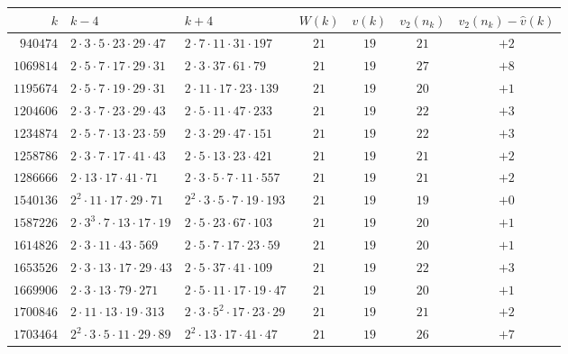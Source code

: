 \documentclass[12pt]{amsart}%
\newcommand{\1}{\mathds{1}}
\theoremstyle{definition}
\numberwithin{equation}{section}
\numberwithin{table}{section}
\numberwithin{figure}{section}
\begin{document}
\begin{table}[htbp]
\centering\small
\setlength{\tabcolsep}{4.5pt}
\begin{tabular}{r l l c c c c}
\toprule
$k$ & $k-4$ & $k+4$ & $W(k)$ & $\hat v(k)$ & $v_2(n_k)$ & $v_2(n_k)-\hat v(k)$\\
\midrule
$940474$  & $2\cdot3\cdot5\cdot23\cdot29\cdot47$     & $2\cdot7\cdot11\cdot31\cdot197$         & $21$ & $19$ & $21$ & $+2$\\
$1069814$ & $2\cdot5\cdot7\cdot17\cdot29\cdot31$     & $2\cdot3\cdot37\cdot61\cdot79$          & $21$ & $19$ & $27$ & $+8$\\
$1195674$ & $2\cdot5\cdot7\cdot19\cdot29\cdot31$     & $2\cdot11\cdot17\cdot23\cdot139$        & $21$ & $19$ & $20$ & $+1$\\
$1204606$ & $2\cdot3\cdot7\cdot23\cdot29\cdot43$     & $2\cdot5\cdot11\cdot47\cdot233$         & $21$ & $19$ & $22$ & $+3$\\
$1234874$ & $2\cdot5\cdot7\cdot13\cdot23\cdot59$     & $2\cdot3\cdot29\cdot47\cdot151$         & $21$ & $19$ & $22$ & $+3$\\
$1258786$ & $2\cdot3\cdot7\cdot17\cdot41\cdot43$     & $2\cdot5\cdot13\cdot23\cdot421$         & $21$ & $19$ & $21$ & $+2$\\
$1286666$ & $2\cdot13\cdot17\cdot41\cdot71$          & $2\cdot3\cdot5\cdot7\cdot11\cdot557$    & $21$ & $19$ & $21$ & $+2$\\
$1540136$ & $2^{2}\cdot11\cdot17\cdot29\cdot71$      & $2^{2}\cdot3\cdot5\cdot7\cdot19\cdot193$ & $21$ & $19$ & $19$ & $+0$\\
$1587226$ & $2\cdot3^{3}\cdot7\cdot13\cdot17\cdot19$ & $2\cdot5\cdot23\cdot67\cdot103$         & $21$ & $19$ & $20$ & $+1$\\
$1614826$ & $2\cdot3\cdot11\cdot43\cdot569$          & $2\cdot5\cdot7\cdot17\cdot23\cdot59$    & $21$ & $19$ & $20$ & $+1$\\
$1653526$ & $2\cdot3\cdot13\cdot17\cdot29\cdot43$    & $2\cdot5\cdot37\cdot41\cdot109$         & $21$ & $19$ & $22$ & $+3$\\
$1669906$ & $2\cdot3\cdot13\cdot79\cdot271$          & $2\cdot5\cdot11\cdot17\cdot19\cdot47$   & $21$ & $19$ & $20$ & $+1$\\
$1700846$ & $2\cdot11\cdot13\cdot19\cdot313$         & $2\cdot3\cdot5^{2}\cdot17\cdot23\cdot29$ & $21$ & $19$ & $21$ & $+2$\\
$1703464$ & $2^{2}\cdot3\cdot5\cdot11\cdot29\cdot89$ & $2^{2}\cdot13\cdot17\cdot41\cdot47$     & $21$ & $19$ & $26$ & $+7$\\

\end{tabular}
\end{table}
\end{document}
